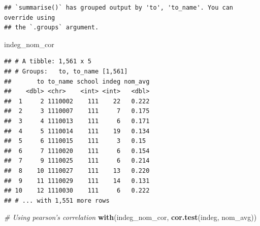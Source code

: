 \documentclass[]{book}
\newenvironment{Shaded}{\begin{snugshade}}{\end{snugshade}}
\newcommand{\CommentTok}[1]{\textcolor[rgb]{0.56,0.35,0.01}{\textit{#1}}}
\newcommand{\DataTypeTok}[1]{\textcolor[rgb]{0.13,0.29,0.53}{#1}}
\newcommand{\DecValTok}[1]{\textcolor[rgb]{0.00,0.00,0.81}{#1}}
\newcommand{\KeywordTok}[1]{\textcolor[rgb]{0.13,0.29,0.53}{\textbf{#1}}}
\newcommand{\NormalTok}[1]{#1}
\newcommand{\OperatorTok}[1]{\textcolor[rgb]{0.81,0.36,0.00}{\textbf{#1}}}
\newcommand{\StringTok}[1]{\textcolor[rgb]{0.31,0.60,0.02}{#1}}
\begin{document}
\begin{Shaded}
\end{Shaded}

\begin{verbatim}
## `summarise()` has grouped output by 'to', 'to_name'. You can override using
## the `.groups` argument.
\end{verbatim}

\begin{Shaded}
\begin{Highlighting}[]
\NormalTok{indeg_nom_cor}
\end{Highlighting}
\end{Shaded}

\begin{verbatim}
## # A tibble: 1,561 x 5
## # Groups:   to, to_name [1,561]
##       to to_name school indeg nom_avg
##    <dbl> <chr>    <int> <int>   <dbl>
##  1     2 1110002    111    22   0.222
##  2     3 1110007    111     7   0.175
##  3     4 1110013    111     6   0.171
##  4     5 1110014    111    19   0.134
##  5     6 1110015    111     3   0.15 
##  6     7 1110020    111     6   0.154
##  7     9 1110025    111     6   0.214
##  8    10 1110027    111    13   0.220
##  9    11 1110029    111    14   0.131
## 10    12 1110030    111     6   0.222
## # ... with 1,551 more rows
\end{verbatim}

\begin{Shaded}
\begin{Highlighting}[]
\CommentTok{# Using pearson's correlation}
\KeywordTok{with}\NormalTok{(indeg_nom_cor, }\KeywordTok{cor.test}\NormalTok{(indeg, nom_avg))}
\end{Highlighting}
\end{Shaded}
\end{document}
